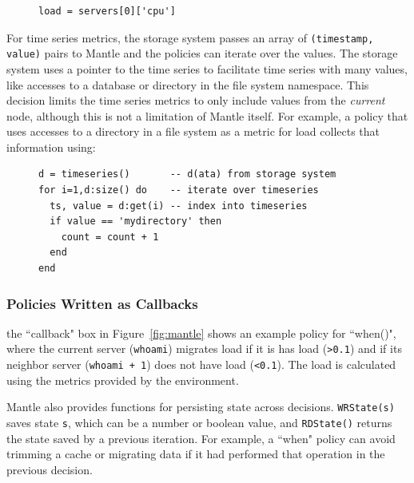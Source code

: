 \begin{figure}[h]
\footnotesize
\begin{verbatim}
load = servers[0]['cpu']
\end{verbatim}
\end{figure}

For time series metrics, the storage system passes an array of \texttt{(timestamp,
value)} pairs to Mantle and the policies can iterate over the values. The
storage system uses a pointer to the time series to facilitate time series with many
values, like accesses to a database or directory in the file system namespace.
This decision limits the time series metrics to only include values from the
{\it current} node, although this is not a limitation of Mantle itself.  For
example, a policy that uses accesses to a directory in a file system as a
metric for load collects that information using:

\begin{figure}[h]
\footnotesize
\begin{verbatim}
d = timeseries()       -- d(ata) from storage system
for i=1,d:size() do    -- iterate over timeseries
  ts, value = d:get(i) -- index into timeseries 
  if value == 'mydirectory' then
    count = count + 1
  end
end
\end{verbatim}
\end{figure}



\subsubsection{Policies Written as Callbacks} the ``callback" box in
Figure~\ref{fig:mantle} shows an example policy for ``when()", where the
current server (\texttt{whoami}) migrates load if it is has load
(\texttt{>0.1}) and if its neighbor server (\texttt{whoami + 1}) does not have
load (\texttt{<0.1}). The load is calculated using the metrics provided by the
environment.

Mantle also provides functions for persisting state across decisions.
\texttt{WRState(s)} saves state \texttt{s}, which can be a number or boolean
value, and \texttt{RDState()} returns the state saved by a previous iteration.
For example, a ``when" policy can avoid trimming a cache or migrating data if
it had performed that operation in the previous decision.



